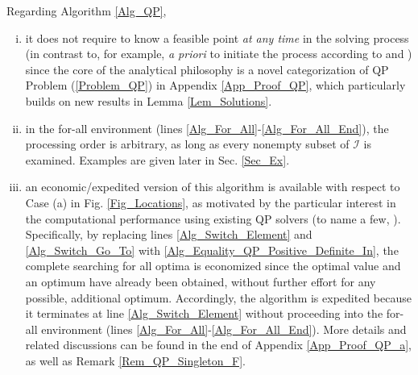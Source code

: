 \documentclass{imaman}
\newcommand{\calI}{{\mathcal I}}
\numberwithin{equation}{section}
\begin{document}
\begin{remark} Regarding Algorithm \ref{Alg_QP},
\begin{enumerate}[i)]
\item it does not require to know a feasible point \textit{at any time} in the solving process (in contrast to, for example, \textit{a priori} to initiate the process according to \cite{BoVa:04} and \cite{Lu(Ye):03(16)}) since the core of the analytical philosophy is a novel categorization of QP Problem (\ref{Problem_QP}) in Appendix \ref{App_Proof_QP}, which particularly builds on new results in Lemma \ref{Lem_Solutions}.
\newpage\item\label{Rem_Alg_Order_For_All} in the for-all environment (lines \ref{Alg_For_All}-\ref{Alg_For_All_End}), the processing order is arbitrary, as long as every nonempty subset of $\calI$ is examined. Examples are given later in Sec. \ref{Sec_Ex}.
\item an economic/expedited version of this algorithm is available with respect to Case (a) in Fig. \ref{Fig_Locations}, as motivated by the particular interest in the computational performance using existing QP solvers (to name a few, \cite{JoFo:13,RaLe:19}). Specifically, by replacing lines \ref{Alg_Switch_Element} and \ref{Alg_Switch_Go_To} with \ref{Alg_Equality_QP_Positive_Definite_In}, the complete searching for all optima is economized since the optimal value and an optimum have already been obtained, without further effort for any possible, additional optimum. Accordingly, the algorithm is expedited because it terminates at line \ref{Alg_Switch_Element} without proceeding into the for-all environment (lines \ref{Alg_For_All}-\ref{Alg_For_All_End}). More details and related discussions can be found in the end of Appendix \ref{App_Proof_QP_a}, as well as Remark \ref{Rem_QP_Singleton_F}.
\end{enumerate}
\label{Rem_Alg}
\end{remark}
\end{document}
